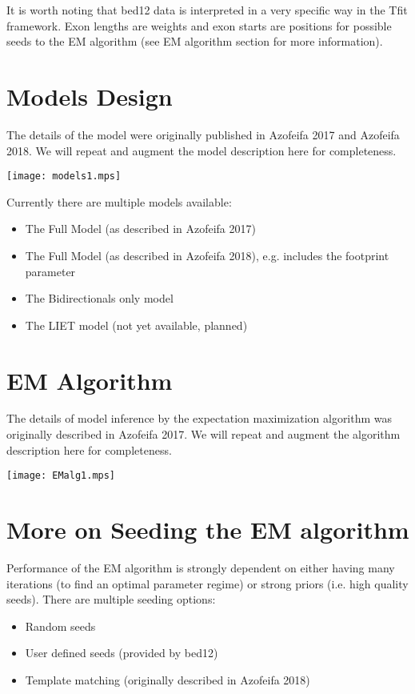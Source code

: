 \documentclass[11pt]{article}
\begin{document}
It is worth noting that bed12 data is interpreted in a very specific way
in the Tfit framework.   Exon lengths are weights and exon starts are 
positions for possible seeds to the EM algorithm (see EM algorithm 
section for more information).

\clearpage
\section{Models Design}
The details of the model were originally published in Azofeifa 2017 and
Azofeifa 2018.  We will repeat and augment the model description here for
completeness.  

\texttt{[image: models1.mps]}

Currently there are multiple models available:

\begin{itemize}
\item The Full Model (as described in Azofeifa 2017)
\item The Full Model (as described in Azofeifa 2018), e.g. includes
the footprint parameter
\item The Bidirectionals only model
\item The LIET model (not yet available, planned)
\end{itemize}

\section{EM Algorithm}
The details of model inference by the expectation maximization algorithm was
originally described in Azofeifa 2017.  We will repeat and augment the 
algorithm description here for completeness.

\texttt{[image: EMalg1.mps]}

\section{More on Seeding the EM algorithm}
Performance of the EM algorithm is strongly dependent on either having 
many iterations (to find an optimal parameter regime) or strong priors
(i.e. high quality seeds).  There are multiple seeding options:

\begin{itemize}
\item Random seeds
\item User defined seeds (provided by bed12)
\item Template matching (originally described in Azofeifa 2018)
\end{itemize}
\end{document}
